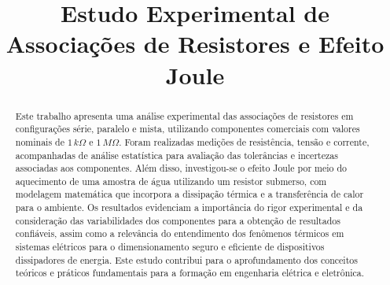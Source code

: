 \documentclass[conference]{IEEEtran}
\begin{document}
\title{Estudo Experimental de Associações de Resistores e Efeito Joule\\
}
\author{
    \and
    \and
}



\maketitle

\begin{abstract}
    Este trabalho apresenta uma análise experimental das associações de resistores em configurações série, paralelo e mista, utilizando componentes comerciais com valores nominais de \(1\,k\Omega\) e \(1\,M\Omega\). Foram realizadas medições de resistência, tensão e corrente, acompanhadas de análise estatística para avaliação das tolerâncias e incertezas associadas aos componentes. Além disso, investigou-se o efeito Joule por meio do aquecimento de uma amostra de água utilizando um resistor submerso, com modelagem matemática que incorpora a dissipação térmica e a transferência de calor para o ambiente. Os resultados evidenciam a importância do rigor experimental e da consideração das variabilidades dos componentes para a obtenção de resultados confiáveis, assim como a relevância do entendimento dos fenômenos térmicos em sistemas elétricos para o dimensionamento seguro e eficiente de dispositivos dissipadores de energia. Este estudo contribui para o aprofundamento dos conceitos teóricos e práticos fundamentais para a formação em engenharia elétrica e eletrônica.
\end{abstract}
\end{document}
